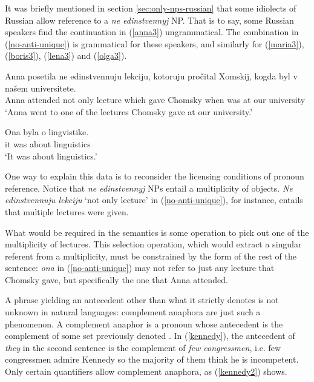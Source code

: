 It was briefly mentioned in section \ref{sec:only-nps-russian} that some idiolects of Russian allow reference to a \textit{ne edinstvennyj} NP. That is to say, some Russian speakers find the continuation in (\ref{anna3}) ungrammatical. The combination in (\ref{no-anti-unique}) is grammatical for these speakers, and similarly for (\ref{maria3}), (\ref{boris3}), (\ref{lena3}) and (\ref{olga3}).

\begin{exe}
	\ex \label{no-anti-unique} \begin{xlist}
		\ex \gll Anna posetila ne edinstvennuju lekciju, kotoruju pro\v{c}ital Xomskij, kogda byl v na\v{s}em universitete.\\
		Anna attended not only lecture which gave Chomsky when was at our university\\
		\glt `Anna went to one of the lectures Chomsky gave at our university.'
		
		\ex \gll Ona byla o lingvistike.\\
		it was about linguistics\\
		\glt `It was about linguistics.'
	\end{xlist}
\end{exe}

One way to explain this data is to reconsider the licensing conditions of pronoun reference. Notice that \textit{ne edinstvennyj} NPs entail a multiplicity of objects. \textit{Ne edinstvennuju lekciju} `not only lecture' in (\ref{no-anti-unique}), for instance, entails that multiple lectures were given.

What would be required in the semantics is some operation to pick out one of the multiplicity of lectures. This selection operation, which would extract a singular referent from a multiplicity, must be constrained by the form of the rest of the sentence: \textit{ona} in (\ref{no-anti-unique}) may not refer to just any lecture that Chomsky gave, but specifically the one that Anna attended.

A phrase yielding an antecedent other than what it strictly denotes is not unknown in natural languages: complement anaphora are just such a phenomenon. A complement anaphor is a pronoun whose antecedent is the complement of some set previously denoted \citep{nouwen03, schwarz09}. In (\ref{kennedy}), the antecedent of \textit{they} in the second sentence is the complement of \textit{few congressmen}, i.e. few congressmen admire Kennedy so the majority of them think he is incompetent. Only certain quantifiers allow complement anaphora, as (\ref{kennedy2}) shows.

